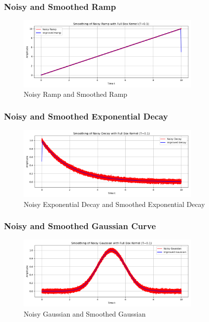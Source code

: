 \subsubsection{Noisy and Smoothed Ramp}
\begin{figure}[!ht]
\centering
\includegraphics[width=0.8\textwidth]{codes/codes_sin_3_and_smoothening/figs/noisy_ramp_plot.png}
\caption{Noisy Ramp and Smoothed Ramp}
\end{figure}
\FloatBarrier

\subsubsection{Noisy and Smoothed Exponential Decay}
\begin{figure}[!ht]
\centering
\includegraphics[width=0.8\textwidth]{codes/codes_sin_3_and_smoothening/figs/noisy_decay_plot.png}
\caption{Noisy Exponential Decay and Smoothed Exponential Decay}
\end{figure}
\FloatBarrier

\subsubsection{Noisy and Smoothed Gaussian Curve}
\begin{figure}[!ht]
\centering
\includegraphics[width=0.8\textwidth]{codes/codes_sin_3_and_smoothening/figs/noisy_gaussian_plot.png}
\caption{Noisy Gaussian and Smoothed Gaussian}
\end{figure}
\FloatBarrier

